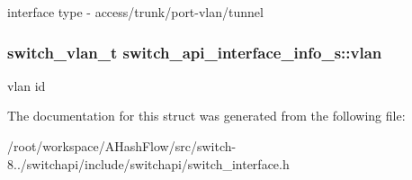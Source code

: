 interface type -\/ access/trunk/port-\/vlan/tunnel \hypertarget{structswitch__api__interface__info__s_a47e768f0b3674534b00eb1ce3ae91f26}{
\subsubsection[{vlan}]{\setlength{\rightskip}{0pt plus 5cm}switch\+\_\+vlan\+\_\+t switch\+\_\+api\+\_\+interface\+\_\+info\+\_\+s\+::vlan}}\label{structswitch__api__interface__info__s_a47e768f0b3674534b00eb1ce3ae91f26}
vlan id 

The documentation for this struct was generated from the following file\+:\begin{DoxyCompactItemize}
\item 
/root/workspace/\+A\+Hash\+Flow/src/switch-\/8../switchapi/include/switchapi/switch\+\_\+interface.\+h\end{DoxyCompactItemize}

